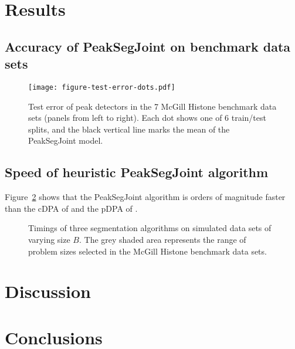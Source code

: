 \documentclass{article} %
\begin{document}

\section{Results}

\subsection{Accuracy of PeakSegJoint on benchmark data sets}

\begin{figure}[b!]
  \centering
  \texttt{[image: figure-test-error-dots.pdf]}
  \caption{Test error of peak detectors in the 7 McGill Histone
    benchmark data sets (panels from left to right). Each dot shows
    one of 6 train/test splits, and the black vertical line marks the
    mean of the PeakSegJoint model.}
  \label{fig:test-error-dots}
\end{figure}

\subsection{Speed of heuristic PeakSegJoint algorithm}

Figure~\ref{fig:timings} shows that the PeakSegJoint algorithm is
orders of magnitude faster than the cDPA of \citet{HOCKING-PeakSeg}
and the pDPA of \citet{Segmentor}.

\begin{figure}[b!]
  \centering
  
  \vskip -0.5cm
  \caption{Timings of three segmentation algorithms on simulated
    data sets of varying size $B$. The grey shaded area represents the
    range of problem sizes selected in the McGill Histone benchmark
    data sets. }
  \label{fig:timings}
\end{figure}

\section{Discussion}

\section{Conclusions}



\end{document}
